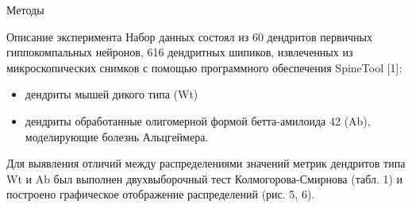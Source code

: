 \documentclass[final]{beamer}
\newlength{\colwidth}
\begin{document}
\begin{frame}[t]
\begin{columns}[t]
\begin{column}{\colwidth}
\begin{block}{Методы}

  \end{block}
  
  \vspace{-0.8em}  
  
  \begin{block}{Описание эксперимента}
    Набор данных состоял из 60 дендритов первичных гиппокомпальных нейронов, 616 дендритных шипиков, извлеченных из микроскопических снимков с помощью программного обеспечения SpineTool [1]:\\
    \begin{itemize}
      \item дендриты мышей дикого типа (Wt)
      \item дендриты обработанные олигомерной формой бетта-амилоида 42 (Ab), моделирующие болезнь Альцгеймера.
    \end{itemize}

    Для выявления отличий между распределениями значений метрик дендритов типа Wt и Ab был выполнен двухвыборочный тест Колмогорова-Смирнова (табл. 1) и построено графическое отображение распределений (рис. 5, 6).

  \end{block}





\end{column}
\end{columns}
\end{frame}
\end{document}

